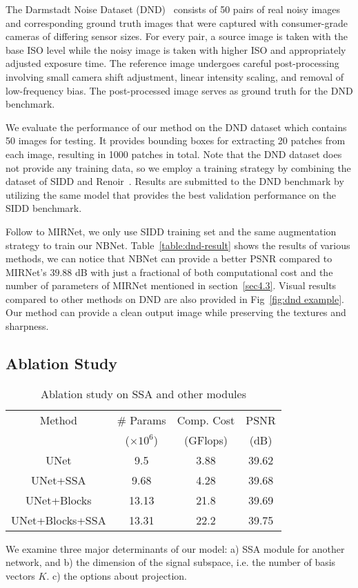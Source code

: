 \documentclass[final]{cvpr}
\begin{document}
The Darmstadt Noise Dataset (DND)~\cite{plotz2017benchmarking} consists of 50 pairs of real noisy images and corresponding ground truth images that were captured with consumer-grade cameras of differing sensor sizes. For every pair, a source image is taken with the base ISO level while the noisy image is taken with higher ISO and appropriately adjusted exposure time. The reference image undergoes careful post-processing involving small camera shift adjustment, linear intensity scaling, and removal of low-frequency bias. The post-processed image serves as ground truth for the DND benchmark.

We evaluate the performance of our method on the DND dataset which contains 50 images for testing. It provides bounding boxes for extracting 20 patches from each image, resulting in 1000 patches in total. Note that the DND dataset does not provide any training data, so we employ a training strategy by combining the dataset of SIDD and Renoir~\cite{anaya2014renoir}.  Results are submitted to the DND benchmark by utilizing the same model that provides the best validation performance on the SIDD benchmark.



Follow to MIRNet, we only use SIDD training set and the same augmentation strategy to train our NBNet. Table~\ref{table:dnd-result} shows the results of various methods, we can notice that NBNet can provide a better PSNR compared to MIRNet's $39.88$ dB with just a fractional of both computational cost and the number of parameters of MIRNet mentioned in section~\ref{sec4.3}. Visual results compared to other methods on DND are also provided in Fig~\ref{fig:dnd example}. Our method can provide a clean output image while preserving the textures and sharpness.




\subsection{Ablation Study}

\begin{table}[t]
    \centering
    \begin{tabular}{cccc}
    \toprule
    Method & \# Params & Comp. Cost &PSNR \\
         & ($\times 10^6$) & (GFlops) & (dB)\\
    \midrule
    UNet & 9.5 & 3.88 & 39.62\\
UNet+SSA & 9.68 & 4.28 & 39.68\\
UNet+Blocks & 13.13 & 21.8 & 39.69\\
UNet+Blocks+SSA & 13.31 & 22.2 & 39.75 \\
    \bottomrule
    \end{tabular}
    \caption{Ablation study on SSA and other modules}
    \label{tab:abl study}
\end{table} We examine three major determinants of our model: a) SSA module for another network, and b) the dimension of the signal subspace, i.e. the number of basis vectors $K$. c) the options about projection.
\end{document}
